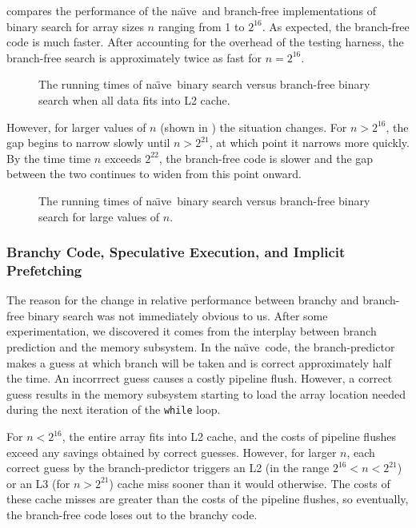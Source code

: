 \documentclass{patmorin}
\newcommand{\naive}{na\"{\i}ve}
\begin{document}
 compares the performance of the \naive\ and
branch-free implementations of binary search for array sizes $n$
ranging from 1 to $2^{16}$.  As expected, the branch-free code is much
faster. After accounting for the overhead of the testing harness, the
branch-free search is approximately twice as fast for $n=2^{16}$.

\begin{figure}
   \caption{The running times of \naive\ binary search versus
    branch-free binary search when all data
    fits into L2 cache.}
\end{figure}

However, for larger values of $n$ (shown in ) the
situation changes.  For $n>2^{16}$, the gap begins to narrow slowly
until $n>2^{21}$, at which point it narrows more quickly.  By the time
time $n$ exceeds $2^{22}$, the branch-free code is slower and the gap
between the two continues to widen from this point onward.

\begin{figure}
   \caption{The running times of \naive\ binary search versus
    branch-free binary search for large values of $n$.}
\end{figure}

\subsubsection{Branchy Code, Speculative Execution, and Implicit Prefetching}

The reason for the change in relative performance between branchy
and branch-free binary search was not immediately obvious to us.
After some experimentation, we discovered it comes from the interplay
between branch prediction and the memory subsystem.  In the \naive\
code, the branch-predictor makes a guess at which branch will be taken
and is correct approximately half the time. An incorrrect guess causes a
costly pipeline flush.  However, a correct guess results in the memory
subsystem starting to load the array location needed during the next
iteration of the \texttt{while} loop.

For $n<2^{16}$, the entire array fits into L2 cache, and the costs
of pipeline flushes exceed any savings obtained by correct guesses.
However, for larger $n$, each correct guess by the branch-predictor
triggers an L2 (in the range $2^{16}<n<2^{21}$) or an L3 (for $n>2^{21}$)
cache miss sooner than it would otherwise.  The costs of these cache
misses are greater than the costs of the pipeline flushes, so eventually,
the branch-free code loses out to the branchy code.
\end{document}
